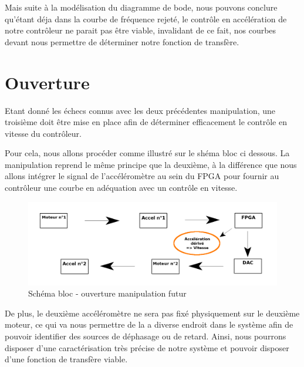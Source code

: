 \documentclass[french,a4paper,12pt]{report}
\begin{document}
			Mais suite à la modélisation du diagramme de bode, nous pouvons conclure qu'étant déja dans la courbe de fréquence rejeté, le contrôle en accélération de notre contrôleur ne parait pas être viable, invalidant de ce fait, nos courbes devant nous permettre de déterminer notre fonction de transfère.
			
\newpage
			
		\section{Ouverture}
	
		Etant donné les échecs connus avec les deux précédentes manipulation, une troisième doit être mise en place afin de déterminer efficacement le contrôle en vitesse du contrôleur.
		
		Pour cela, nous allons procéder comme illustré sur le shéma bloc ci dessous. La manipulation reprend le même principe que la deuxième, à la différence que nous allons intégrer le signal de l'accéléromètre au sein du FPGA pour fournir au contrôleur une courbe en adéquation avec un contrôle en vitesse.
		
	\begin{figure}[!ht]
    \center
  	\includegraphics[width=18cm]{manip3.png}
    \caption{Schéma bloc - ouverture manipulation futur}
	\end{figure}
	
	De  plus, le deuxième accéléromètre ne sera pas fixé physiquement sur le deuxième moteur, ce qui va nous permettre de la a diverse endroit dans le système afin de pouvoir identifier des sources de déphasage ou de retard. Ainsi, nous pourrons disposer d'une caractérisation très précise de notre système et pouvoir disposer d'une fonction de transfère viable.
	
	
	


	
	
	
	
	
	
\end{document}
